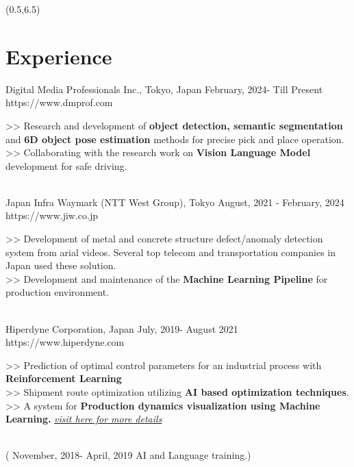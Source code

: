 \documentclass[article]{twentysecondcv_v2} %
\begin{document}
\begin{textblock}{10}(0.5,6.5)
\section{Experience}
{Digital Media Professionals Inc., Tokyo, Japan}
{February, 2024- Till Present}
{https://www.dmprof.com}
\begin{multiline}
>> Research and development of \textbf{object detection, semantic segmentation} and \textbf{6D object pose estimation} methods for precise pick and place operation.\\
>> Collaborating with the research work on \textbf{Vision Language Model} development for safe driving.
\end{multiline}\\

{Japan Infra Waymark (NTT West Group), Tokyo}
{August, 2021 - February, 2024}
{https://www.jiw.co.jp}
\begin{multiline}
>>  Development of metal and concrete structure defect/anomaly detection system from arial videos. Several top telecom and transportation companies in Japan used these solution.\\
>> Development and maintenance of the \textbf{Machine Learning Pipeline} for production environment. %
\end{multiline}\\


{Hiperdyne Corporation, Japan }
{July, 2019- August 2021 }
{https://www.hiperdyne.com}
\begin{multiline}
>> Prediction of optimal control parameters for an industrial process with \textbf{Reinforcement Learning}\\ 
>> Shipment route optimization utilizing \textbf{AI based optimization techniques}. \\
>> A system for \textbf{Production dynamics visualization using Machine Learning.}  \href  {https://irfanhasib0.github.io/\#ai_project_link_1}{\itshape \color{blue} visit here for more details}\\
\end{multiline}\\
({\color{gray} November, 2018- April, 2019} {AI and Language training.})\\



\end{textblock}
\end{document}
